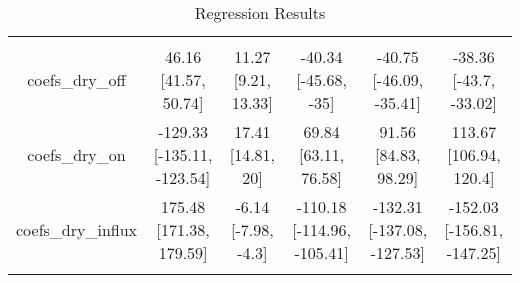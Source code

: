 
\begin{table}[!htbp] \centering 
  \caption{Regression Results} 
  \label{} 
\begin{tabular}{@{\extracolsep{0pt}} cccccc} 
\\[-1.8ex]\hline 
\hline \\[-1.8ex] 
coefs\_dry\_off & 46.16 [41.57, 50.74] & 11.27 [9.21, 13.33] & -40.34 [-45.68, -35] & -40.75 [-46.09, -35.41] & -38.36 [-43.7, -33.02] \\ 
coefs\_dry\_on & -129.33 [-135.11, -123.54] & 17.41 [14.81, 20] & 69.84 [63.11, 76.58] & 91.56 [84.83, 98.29] & 113.67 [106.94, 120.4] \\ 
coefs\_dry\_influx & 175.48 [171.38, 179.59] & -6.14 [-7.98, -4.3] & -110.18 [-114.96, -105.41] & -132.31 [-137.08, -127.53] & -152.03 [-156.81, -147.25] \\ 
\hline \\[-1.8ex] 
\end{tabular} 
\end{table} 
